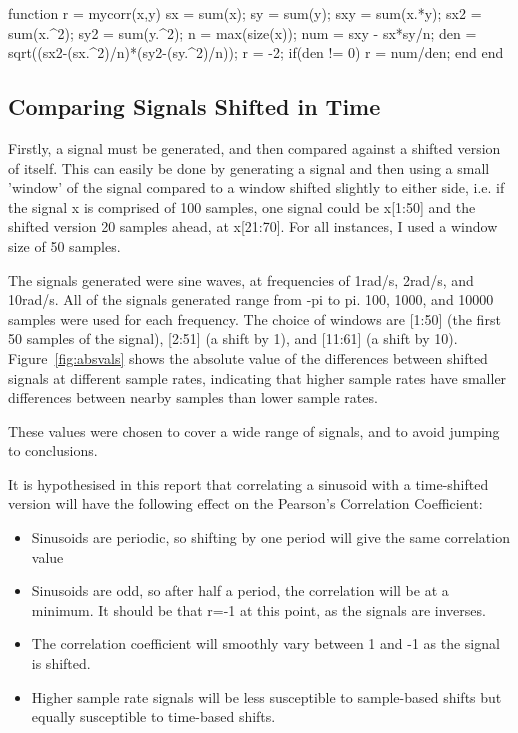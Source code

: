 \begin{Matlab}
function r = mycorr(x,y)
	sx  = sum(x);
	sy  = sum(y);
	sxy = sum(x.*y);    %
	sx2 = sum(x.^2);    %
	sy2 = sum(y.^2);
	n   = max(size(x)); %
	num = sxy - sx*sy/n;
	den = sqrt((sx2-(sx.^2)/n)*(sy2-(sy.^2)/n));
	r = -2; %
	if(den != 0)
		r = num/den;
	end
end
\end{Matlab}

\subsection{Comparing Signals Shifted in Time}

Firstly, a signal must be generated, and then compared against a shifted version of itself. This can easily be done by generating a signal and then using a small 'window' of the signal compared to a window shifted slightly to either side, i.e. if the signal x is comprised of 100 samples, one signal could be x[1:50] and the shifted version 20 samples ahead, at x[21:70]. For all instances, I used a window size of 50 samples.

The signals generated were sine waves, at frequencies of 1rad/s, 2rad/s, and 10rad/s. All of the signals generated range from -pi to pi. 100, 1000, and 10000 samples were used for each frequency.  The choice of windows are [1:50] (the first 50 samples of the signal), [2:51] (a shift by 1), and [11:61] (a shift by 10). Figure~\ref{fig:absvals} shows the absolute value of the differences between shifted signals at different sample rates, indicating that higher sample rates have smaller differences between nearby samples than lower sample rates.

These values were chosen to cover a wide range of signals, and to avoid jumping to conclusions.

It is hypothesised in this report that correlating a sinusoid with a time-shifted version will have the following effect on the Pearson's Correlation Coefficient:

\begin{itemize}
	\item Sinusoids are periodic, so shifting by one period will give the same correlation value
	\item Sinusoids are odd, so after half a period, the correlation will be at a minimum. It should be that r=-1 at this point, as the signals are inverses.
	\item The correlation coefficient will smoothly vary between 1 and -1 as the signal is shifted.
	\item Higher sample rate signals will be less susceptible to sample-based shifts but equally susceptible to time-based shifts.
\end{itemize}

